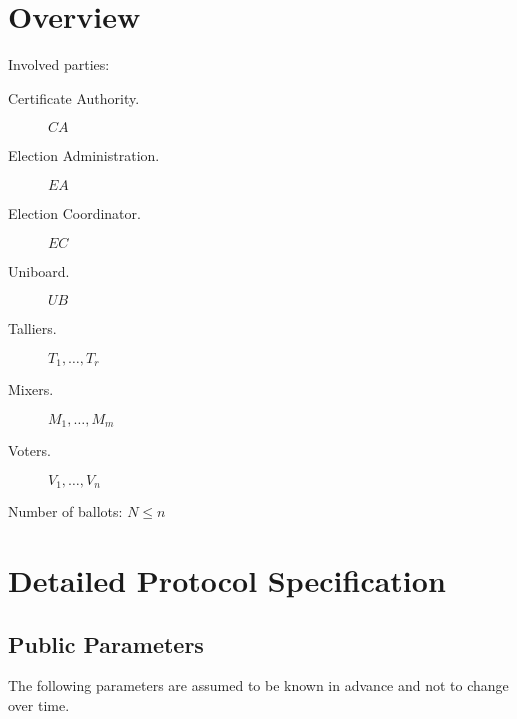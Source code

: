 \documentclass[bibtotoc,halfparskip,oneside]{scrreprt}
\newcommand{\CA}{\ensuremath{\mathit{CA}}\xspace}
\newcommand{\EA}{\ensuremath{\mathit{EA}}\xspace}
\newcommand{\EC}{\ensuremath{\mathit{EC}}\xspace}
\newcommand{\UB}{\ensuremath{\mathit{UB}}\xspace}
\newcommand{\Tallier}[1]{\ensuremath{\mathit{T}_{#1}}\xspace}
\newcommand{\Mixer}[1]{\ensuremath{\mathit{M}_{#1}}\xspace}
\newcommand{\Voter}[1]{\ensuremath{\mathit{V}_{#1}}\xspace}
\begin{document}
\section{Overview}

Involved parties:

\begin{description}
	\item[Certificate Authority.] \CA
	\item[Election Administration.] \EA
	\item[Election Coordinator.] \EC
	\item[Uniboard.] \UB
	\item[Talliers.] $\Tallier{1},\ldots,\Tallier{r}$
	\item[Mixers.] $\Mixer{1},\ldots,\Mixer{m}$
	\item[Voters.] $\Voter{1},\ldots,\Voter{n}$
\end{description}

Number of ballots: $N\leq n$

\section{Detailed Protocol Specification}

\subsection{Public Parameters}

The following parameters are assumed to be known in advance and not to change over time.
\end{document}
